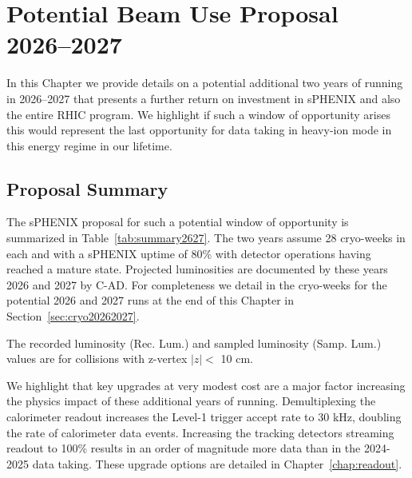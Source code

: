 \chapter{Potential Beam Use Proposal 2026--2027}
\label{chap:beam_use_proposal_extra}

In this Chapter we provide details on a potential additional two years of running in 2026--2027 that presents a further return on investment in sPHENIX and also the entire RHIC program.   We highlight if such a window of opportunity arises this would represent the last opportunity for data taking in heavy-ion mode in this energy regime in our lifetime. 

\section{Proposal Summary}

The sPHENIX proposal for such a potential window of opportunity is summarized in Table~\ref{tab:summary2627}.   The two years assume 28 cryo-weeks in each and with a sPHENIX uptime of 80\% with detector operations having reached a mature state.   Projected luminosities are documented by these years 2026 and 2027 by C-AD.  For completeness we detail in the cryo-weeks for the potential 2026 and 2027 runs at the end of this Chapter in Section~\ref{sec:cryo20262027}.

\begin{table}[h!]
\centering
\caption{The recorded luminosity (Rec. Lum.) and sampled luminosity (Samp. Lum.) values are for collisions with z-vertex $|z|<$ 10 cm.  \label{tab:summary2627}}
\bigskip
\centering

\end{table}

We highlight that key upgrades at very modest cost are a major factor increasing the physics impact of these additional years of running.   Demultiplexing the calorimeter readout increases the Level-1 trigger accept rate to 30 kHz, doubling the rate of calorimeter data events.    Increasing the tracking detectors streaming readout to 100\% results in an order of magnitude more data than in the 2024-2025 data taking.    These upgrade options are detailed in Chapter~\ref{chap:readout}.


